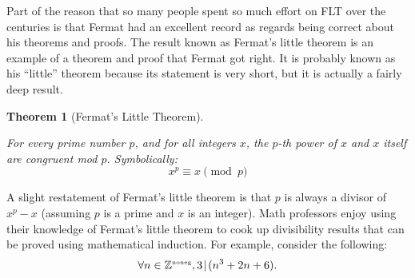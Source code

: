 \documentclass[10pt,]{book}
\theoremstyle{plain}
\newtheorem{theorem}{Theorem}[section]
\theoremstyle{definition}
\theoremstyle{definition}
\numberwithin{equation}{section}
\renewcommand{\Naturals}{{\mathbb Z}^{\mbox{\tiny noneg}} }
\newcommand{\divides}{\!\mid\!}
\newcommand{\Naturals}{{\mathbb N}}
\begin{document}
    Part of the reason that so many people spent so much effort on FLT
    over the centuries is that Fermat had an excellent record as regards
    being correct about his theorems and proofs. The result known as Fermat's
    little theorem is an example of a theorem and proof that Fermat got
    right. It is probably known as his ``little'' theorem because its
    statement is very short, but it is actually a fairly deep result.
\begin{theorem}[{Fermat's Little Theorem}]\label{theorem-21}

        For every prime number \(p\), and for all integers \(x\), the \(p\)-th
        power of \(x\) and \(x\) itself are congruent mod \(p\). Symbolically:
        \begin{equation*}
          x^p \equiv x \pmod{p}
        \end{equation*}
\end{theorem}
\par

    A slight restatement of Fermat's little theorem is that \(p\) is
    always a divisor of \(x^p-x\) (assuming \(p\) is a prime and \(x\) is an integer).
    Math professors enjoy using their knowledge of Fermat's little theorem
    to cook up divisibility results that can be proved using mathematical
    induction. For example, consider the following:
    \begin{equation*}
      \forall n \in \Naturals,  3 \divides (n^3 + 2n + 6).
    \end{equation*}
\par
\end{document}
